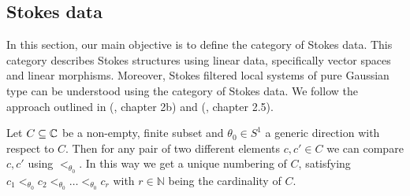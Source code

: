 
\begin{comment}
\begin{prop} For any non-empty, finite set $C \subseteq \C$, the category $\LocSt(C)$ is abelian.
\end{prop}

\begin{proof} As a morphism $\lambda$ in $\LocSt(C)$ is a morphism in $\Loc_{S^1}$ and this category is abelian, $\ker(\lambda)$ and $\coker(\lambda)$ are local systems on $S^1$. Thus we need to find matching filtrations. Let $\lambda: (\Lo,(\Lo_{\leq \bullet})) \to (\Lo',(\Lo'_{\leq \bullet}))$ be a morphism of Stokes filtered local systems. Then for any $C$-good interval $I$, $\lambda_{\vert_I}$ is graded with respect to the unique splittings in (\ref{splitting}). This implies that on any $C$-good interval $\ker(\lambda_{\vert_I})_{\leq \bullet} = \ker(\lambda_{\vert_I}: (\Lo_{\vert_I})_{\leq \bullet} \to (\Lo_{\vert_I}')_{\leq \bullet})$
\textcolor{red}{Bisschen unklar; Denke das lasse ich raus.}
\end{proof}
\end{comment}

\subsection{Stokes data}

In this section, our main objective is to define the category of Stokes data. This category describes Stokes structures using linear data, specifically vector spaces and linear morphisms. Moreover, Stokes filtered local systems of pure Gaussian type can be understood using the category of Stokes data. We follow the approach outlined in (\cite{Sabbah_2016}, chapter 2b) and (\cite{Hohl_Diss}, chapter 2.5).
\newline

 Let $C \subseteq \mathbb{C}$ be a non-empty, finite subset and $\theta_0 \in S^1$ a generic direction with respect to $C$. Then for any pair of two different elements $c,c' \in C$ we can compare $c, c'$ using $<_{\theta_0}$. In this way we get a unique numbering of $C$, satisfying $c_1 <_{\theta_0} c_2 <_{\theta_0} \dots <_{\theta_0} c_r$ with $r \in \mathbb{N}$ being the cardinality of $C$. 


